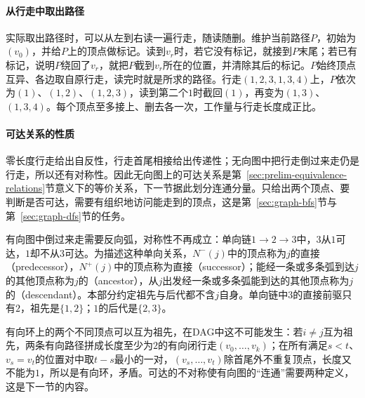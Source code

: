 \paragraph{从行走中取出路径}
实际取出路径时，可以从左到右读一遍行走，随读随删。维护当前路径$P$，初始为$(v_0)$，并给$P$上的顶点做标记。读到$v_r$时，若它没有标记，就接到$P$末尾；若已有标记，说明$P$绕回了$v_r$，就把$P$截到$v_r$所在的位置，并清除其后的标记。$P$始终顶点互异、各边取自原行走，读完时就是所求的路径。行走$(1,2,3,1,3,4)$上，$P$依次为$(1)$、$(1,2)$、$(1,2,3)$，读到第二个$1$时截回$(1)$，再变为$(1,3)$、$(1,3,4)$。每个顶点至多接上、删去各一次，工作量与行走长度成正比。

\paragraph{可达关系的性质}
零长度行走给出自反性，行走首尾相接给出传递性；无向图中把行走倒过来走仍是行走，所以还有对称性。因此无向图上的可达关系是第~\ref{sec:prelim-equivalence-relations}节意义下的等价关系，下一节据此划分连通分量。只给出两个顶点、要判断是否可达，需要有组织地访问能走到的顶点，这是第~\ref{sec:graph-bfs}节与第~\ref{sec:graph-dfs}节的任务。

有向图中倒过来走需要反向弧，对称性不再成立：单向链$1\to2\to3$中，$3$从$1$可达，$1$却不从$3$可达。为描述这种单向关系，$N^-(j)$中的顶点称为$j$的直接（predecessor），$N^+(j)$中的顶点称为直接（successor）；能经一条或多条弧到达$j$的其他顶点称为$j$的（ancestor），从$j$出发经一条或多条弧能到达的其他顶点称为$j$的（descendant）。本部分约定祖先与后代都不含$j$自身。单向链中$3$的直接前驱只有$2$，祖先是$\{1,2\}$；$1$的后代是$\{2,3\}$。

有向环上的两个不同顶点可以互为祖先，在DAG中这不可能发生：若$i\neq j$互为祖先，两条有向路径拼成长度至少为$2$的有向闭行走$(v_0,\ldots,v_k)$；在所有满足$s<t$、$v_s=v_t$的位置对中取$t-s$最小的一对，$(v_s,\ldots,v_t)$除首尾外不重复顶点，长度又不能为$1$，所以是有向环，矛盾。可达的不对称使有向图的“连通”需要两种定义，这是下一节的内容。
